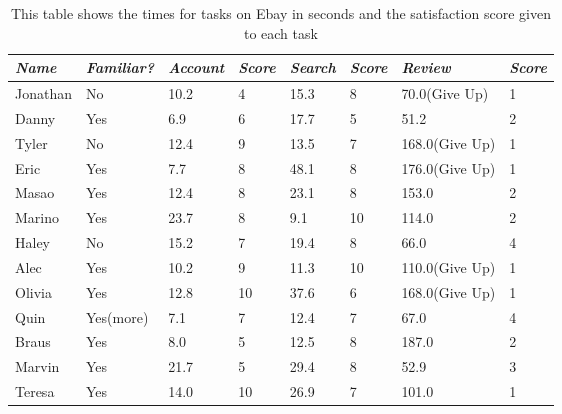 \documentclass{article}
\begin{document}
\newpage

\begin{table}
\centering
\begin{tabular}{|l|l|l|l|l|l|l|l|}
  \hline
  \emph {Name} & \emph{Familiar?} & \emph{Account} & \emph{Score} & \emph{Search} & \emph{Score} & \emph{Review} & \emph{Score}\\
  \hline
  Jonathan & No & 10.2 & 4 & 15.3 & 8 & 70.0(Give Up) & 1\\
  \hline
  Danny & Yes & 6.9 & 6 & 17.7 & 5 & 51.2 & 2\\
  \hline
  Tyler & No & 12.4 & 9 & 13.5 & 7 & 168.0(Give Up) & 1\\
  \hline
  Eric & Yes & 7.7 & 8 & 48.1 & 8 & 176.0(Give Up) & 1\\
  \hline
  Masao & Yes & 12.4 & 8 & 23.1 & 8 & 153.0 & 2\\
  \hline
  Marino & Yes & 23.7 & 8 & 9.1 & 10 & 114.0 & 2\\
  \hline
  Haley & No & 15.2 & 7 & 19.4 & 8 & 66.0 & 4\\
  \hline
  Alec & Yes & 10.2 & 9 & 11.3 & 10 & 110.0(Give Up) & 1\\
  \hline
  Olivia & Yes & 12.8 & 10 & 37.6 & 6 & 168.0(Give Up) & 1\\
  \hline
  Quin & Yes(more) & 7.1 & 7 & 12.4 & 7 & 67.0 & 4\\
  \hline
  Braus & Yes & 8.0 & 5 & 12.5 & 8 & 187.0 & 2\\
  \hline
  Marvin & Yes & 21.7 & 5 & 29.4 & 8 & 52.9 & 3\\
  \hline
  Teresa & Yes & 14.0 & 10 & 26.9 & 7 & 101.0 & 1\\
  \hline
\end{tabular}
\caption{This table shows the times for tasks on Ebay in seconds and the satisfaction score given to each task}
\end{table}
\end{document}
